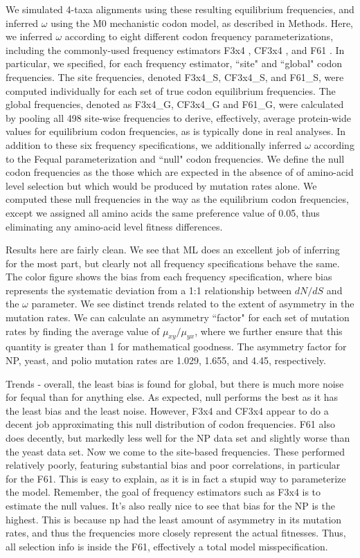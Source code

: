 \documentclass[11pt]{article}
\begin{document}
We simulated 4-taxa alignments using these resulting equilibrium frequencies, and inferred $\omega$ using the M0 mechanistic codon model, as described in Methods. Here, we inferred $\omega$ according to eight different codon frequency parameterizations, including the commonly-used frequency estimators F3x4 \cite{MuseGaut1994}, CF3x4 \cite{Pond2010}, and F61 \cite{GoldmanYang1994}. In particular, we specified, for each frequency estimator, ``site" and ``global" codon frequencies. The site frequencies, denoted F3x4\_S, CF3x4\_S, and F61\_S, were computed individually for each set of true codon equilibrium frequencies. The global frequencies, denoted as F3x4\_G, CF3x4\_G and F61\_G, were calculated by pooling all 498 site-wise frequencies to derive, effectively, average protein-wide values for equilibrium codon frequencies, as is typically done in real analyses. In addition to these six frequency specifications, we additionally inferred $\omega$ according to the Fequal parameterization and ``null" codon frequencies. We define the null codon frequencies as the those which are expected in the absence of of amino-acid level selection but which would be produced by mutation rates alone. We computed these null frequencies in the way as the equilibrium codon frequencies, except we assigned all amino acids the same preference value of 0.05, thus eliminating any amino-acid level fitness differences.


Results here are fairly clean. We see that ML does an excellent job of inferring for the most part, but clearly not all frequency specifications behave the same. The color figure shows the bias from each frequency specification, where bias represents the systematic deviation from a 1:1 relationship between $dN/dS$ and the $\omega$ parameter.  We see distinct trends related to the extent of asymmetry in the mutation rates. We can calculate an asymmetry ``factor" for each set of mutation rates by finding the average value of $\mu_{xy}/\mu_{yx}$, where we further ensure that this quantity is greater than 1 for mathematical goodness. The asymmetry factor for NP, yeast, and polio mutation rates are 1.029, 1.655, and 4.45, respectively. 

Trends - overall, the least bias is found for global, but there is much more noise for fequal than for anything else. As expected, null performs the best as it has the least bias and the least noise. However, F3x4 and CF3x4 appear to do a decent job approximating this null distribution of codon frequencies. F61 also does decently, but markedly less well for the NP data set and slightly worse than the yeast data set.
Now we come to the site-based frequencies. These performed relatively poorly, featuring substantial bias and poor correlations, in particular for the F61. This is easy to explain, as it is in fact a stupid way to parameterize the model.
Remember, the goal of frequency estimators such as F3x4 is to estimate the null values. 
It's also really nice to see that bias for the NP is the highest. This is because np had the least amount of asymmetry in its mutation rates, and thus the frequencies more closely represent the actual fitnesses. Thus, all selection info is inside the F61, effectively a total model misspecification.
\end{document}
